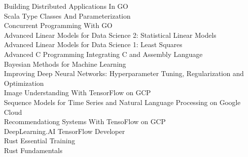 \documentclass{myresume}
\begin{document}
        {Building Distributed Applications In GO} \\
        {Scala Type Classes And Parameterization} \\
        {Concurrent Programming With GO} \\
        {Advanced Linear Models for Data Science 2: Statistical Linear Models} \\
        {Advanced Linear Models for Data Science 1: Least Squares} \\
        {Advanced C Programming Integrating C and Assembly Language} \\
        {Bayesian Methods for Machine Learning} \\
        {Improving Deep Neural Networks: Hyperparameter Tuning, Regularization and Optimization} \\
        {Image Understanding With TensorFlow on GCP} \\
        {Sequence Models for Time Series and Natural Language Processing on Google Cloud} \\
        {Recommendationg Systems With TensoFlow on GCP} \\
        {DeepLearning.AI TensorFlow Developer} \\
        {Rust Essential Training} \\
        {Rust Fundamentals} \\
        
\end{document}
